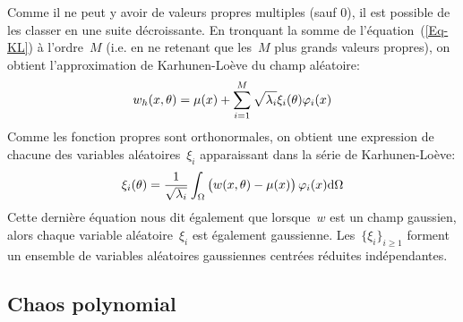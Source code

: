 \medskip
Comme il ne peut y avoir de valeurs propres multiples (sauf 0), il est possible de les classer en une suite décroissante. En tronquant la somme de l'équation~(\ref{Eq-KL}) à l'ordre~$M$ (i.e. en ne retenant que les~$M$ plus grands valeurs propres), on obtient l'approximation de Karhunen-Loève du champ aléatoire:
\begin{equation}\label{Eq-KL}
w_h(x,\theta) = \mu(x) + \displaystyle\sum_{i=1}^M \sqrt{\lambda_i}\xi_i(\theta)\varphi_i(x)
\end{equation}
\medskipvm
Comme les fonction propres sont orthonormales, on obtient une expression de chacune des variables aléatoires~$\xi_i$ apparaissant dans la série de Karhunen-Loève:
\begin{equation}
\xi_i(\theta)=\dfrac1{\sqrt{\lambda_i}}\displaystyle\int_\Omega \begin{pmatrix}w(x,\theta)-\mu(x)\end{pmatrix}\varphi_i(x)\text{d}\Omega
\end{equation}
Cette dernière équation nous dit également que lorsque~$w$ est un champ gaussien, alors chaque variable aléatoire~$\xi_i$ est également gaussienne.
Les~$\{\xi_i\}_{i\ge1}$ forment un ensemble de variables aléatoires gaussiennes centrées réduites indépendantes.


\medskip
\subsection{Chaos polynomial}

